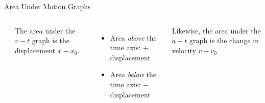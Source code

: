 \documentclass[12pt,compress,aspectratio=169]{beamer}
\newcommand{\mb}[1]{\ensuremath\mathbf{#1}}
\begin{document}
\begin{frame}{Area Under Motion Graphs}
  \begin{columns}
    \begin{center}
    \end{center}
    
    The area under the $v-t$ graph is the displacement $x-x_0$.
    \begin{itemize}
    \item Area \textcolor{blue!20}{\emph{above}} the time axis: $+$
      displacement
    \item Area \textcolor{red!40}{\emph{below}} the time axis: $-$ displacement
    \end{itemize}
    \vspace{.2in}Likewise, the area under the $a-t$ graph is the change in
    velocity $v-v_0$.
  \end{columns}
\end{frame}



%  
%
\end{document}
